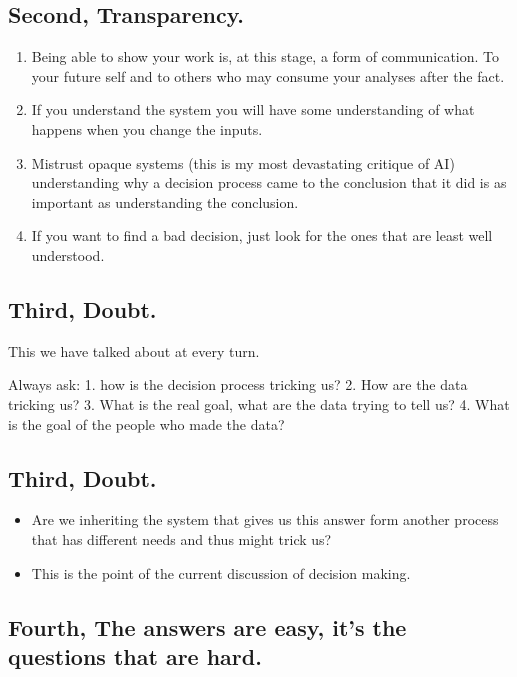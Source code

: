 \hypertarget{second-transparency.}{%
\subsection{Second, Transparency.}\label{second-transparency.}}

\begin{enumerate}
\def\labelenumi{\arabic{enumi}.}
\tightlist
\item
  Being able to show your work is, at this stage, a form of
  communication. To your future self and to others who may consume your
  analyses after the fact.
\item
  If you understand the system you will have some understanding of what
  happens when you change the inputs.
\item
  Mistrust opaque systems (this is my most devastating critique of AI)
  understanding why a decision process came to the conclusion that it
  did is as important as understanding the conclusion.
\item
  If you want to find a bad decision, just look for the ones that are
  least well understood.
\end{enumerate}

\hypertarget{third-doubt.}{%
\subsection{Third, Doubt.}\label{third-doubt.}}

This we have talked about at every turn.

Always ask: 1. how is the decision process tricking us? 2. How are the
data tricking us? 3. What is the real goal, what are the data trying to
tell us? 4. What is the goal of the people who made the data?

\hypertarget{third-doubt.-1}{%
\subsection{Third, Doubt.}\label{third-doubt.-1}}

\begin{itemize}
\tightlist
\item
  Are we inheriting the system that gives us this answer form another
  process that has different needs and thus might trick us?
\item
  This is the point of the current discussion of decision making.
\end{itemize}

\hypertarget{fourth-the-answers-are-easy-its-the-questions-that-are-hard.}{%
\subsection{Fourth, The answers are easy, it's the questions that are
hard.}\label{fourth-the-answers-are-easy-its-the-questions-that-are-hard.}}

